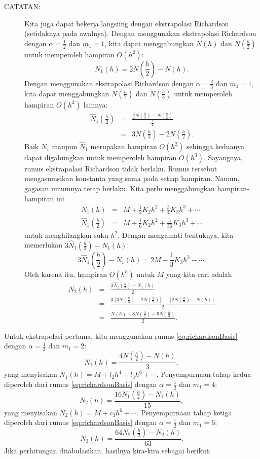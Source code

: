 \begin{description}
\begin{description}
\item [{CATATAN:}] Kita juga dapat bekerja langsung dengan ekstrapolasi
Richardson (setidaknya pada awalnya). Dengan menggunakan ekstrapolasi
Richardson dengan $\alpha=\frac{1}{2}$ dan $m_{1}=1$, kita dapat
menggabungkan $N(h)$ dan $N(\frac{h}{2})$ untuk memperoleh hampiran
$O(h^{2})$:
\[
N_{1}(h)=2N\left(\frac{h}{2}\right)-N(h).
\]
Dengan menggunakan ekstrapolasi Richardson dengan $\alpha=\frac{2}{3}$
dan $m_{1}=1$, kita dapat menggabungkan $N(\frac{h}{2})$ dan $N(\frac{h}{3})$
untuk memperoleh hampiran $O(h^{2})$ lainnya: 
\begin{eqnarray*}
\hat{N}_{1}\left(\frac{h}{2}\right) & = & \frac{\frac{3}{2}N(\frac{h}{3})-N(\frac{h}{2})}{\frac{1}{2}}\\
 & = & 3N\left(\frac{h}{3}\right)-2N\left(\frac{h}{2}\right).
\end{eqnarray*}
Baik $N_{1}$ maupun $\hat{N}_{1}$ merupakan hampiran $O(h^{2})$
sehingga keduanya dapat digabungkan untuk memperoleh hampiran $O(h^{3})$.
Sayangnya, rumus ekstrapolasi Richardson tidak berlaku. Rumus tersebut
mengasumsikan konstanta yang sama pada setiap hampiran. Namun, gagasan
umumnya tetap berlaku. Kita perlu menggabungkan hampiran-hampiran
ini
\begin{eqnarray*}
N_{1}(h) & = & M+\frac{1}{2}K_{2}h^{2}+\frac{3}{4}K_{3}h^{3}+\cdots\\
\hat{N}_{1}\left(\frac{h}{2}\right) & = & M+\frac{1}{6}K_{2}h^{2}+\frac{5}{36}K_{3}h^{3}+\cdots
\end{eqnarray*}
untuk menghilangkan suku $h^{2}$. Dengan mengamati bentuknya, kita
memerlukan $3\hat{N}_{1}(\frac{h}{2})-N_{1}(h)$: 
\[
3\hat{N}_{1}\left(\frac{h}{2}\right)-N_{1}(h)=2M-\frac{1}{3}K_{3}h^{3}-\cdots.
\]
 Oleh karena itu, hampiran $O(h^{3})$ untuk $M$ yang kita cari adalah
\begin{eqnarray*}
N_{2}(h) & = & \frac{3\hat{N}_{1}(\frac{h}{2})-N_{1}(h)}{2}\\
 & = & \frac{3\left[3N(\frac{h}{3})-2N(\frac{h}{2})\right]-\left[2N(\frac{h}{2})-N(h)\right]}{2}\\
 & = & \frac{N(h)-8N(\frac{h}{2})+9N(\frac{h}{3})}{2}.
\end{eqnarray*}
\end{description}
\item [{\ref{exc:calculus-extrapolation-6}:}] Untuk ekstrapolasi pertama,
kita menggunakan rumus \ref{eq:richardsonBasis} dengan $\alpha=\frac{1}{2}$
dan $m_{1}=2$:
\[
N_{1}(h)=\frac{4N(\frac{h}{2})-N(h)}{3},
\]
yang menyisakan $N_{1}(h)=M+l_{2}h^{4}+l_{3}h^{6}+\cdots$. Penyempurnaan
tahap kedua diperoleh dari rumus \ref{eq:richardsonBasis} dengan
$\alpha=\frac{1}{2}$ dan $m_{1}=4$:
\[
N_{2}(h)=\frac{16N_{1}(\frac{h}{2})-N_{1}(h)}{15},
\]
yang menyisakan $N_{2}(h)=M+c_{3}h^{6}+\cdots$. Penyempurnaan tahap
ketiga diperoleh dari rumus \ref{eq:richardsonBasis} dengan $\alpha=\frac{1}{2}$
dan $m_{1}=6$:
\[
N_{3}(h)=\frac{64N_{2}(\frac{h}{2})-N_{2}(h)}{63}.
\]
Jika perhitungan ditabulasikan, hasilnya kira-kira sebagai berikut:


\end{description}
